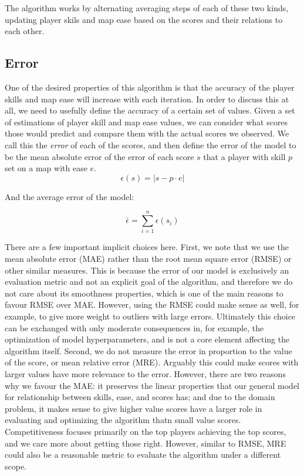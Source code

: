 \documentclass[12pt,a4paper]{article}
\begin{document}
The algorithm works by alternating averaging steps of each of these two kinds, updating player skils and map ease based on the scores and their relations to each other.\\

\subsection{Error}

One of the desired properties of this algorithm is that the accuracy of the player skills and map ease will increase with each iteration. In order to discuss this at all, we need to usefully define the accuracy of a certain set of values. Given a set of estimations of player skill and map ease values, we can consider what scores those would predict and compare them with the actual scores we observed. We call this the {\emph{error}} of each of the scores, and then define the error of the model to be the mean absolute error of the error of each score $s$ that a player with skill $p$ set on a map with ease $e$.\\

\begin{equation}
\label{error}
\epsilon(s) = |s -  p \cdot e|
\end{equation}

And the average error of the model:

\begin{equation}
\label{average_error}
\bar{\epsilon} = \sum\limits_{i=1}^{n} \epsilon(s_i)
\end{equation}

There are a few important implicit choices here. First, we note that we use the mean absolute error (MAE) rather than the root mean square error (RMSE) or other similar measures. This is because the error of our model is exclusively an evaluation metric and not an explicit goal of the algorithm, and therefore we do not care about its smoothness properties, which is one of the main reasons to favour RMSE over MAE. However, using the RMSE could make sense as well, for example, to give more weight to outliers with large errors. Ultimately this choice can be exchanged with only moderate consequences in, for example, the optimization of model hyperparameters, and is not a core element affecting the algorithm itself. Second, we do not measure the error in proportion to the value of the score, or mean relative error (MRE). Arguably this could make scores with larger values have more relevance to the error. However, there are two reasons why we favour the MAE: it preserves the linear properties that our general model for relationship between skills, ease, and scores has; and due to the domain problem, it makes sense to give higher value scores have a larger role in evaluating and optimizing the algorithm thatn small value scores. Competitiveness focuses primarily on the top players achieving the top scores, and we care more about getting those right. However, similar to RMSE, MRE could also be a reasonable metric to evaluate the algorithm under a different scope.\\
\end{document}

